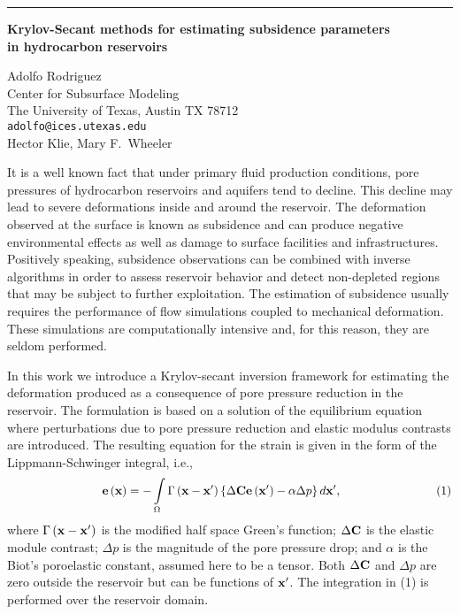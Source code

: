 \documentclass[twosided]{report}
\begin{document}
	\begin{center} \rule{6in}{1pt} \end{center}

\begin{center}
{\large			%
{\bf Krylov-Secant methods for estimating subsidence parameters \\
	in hydrocarbon reservoirs}}

	Adolfo Rodriguez \\
	Center for Subsurface Modeling \\
	The University of Texas,  Austin TX 78712 \\
	{\tt adolfo@ices.utexas.edu} \\
	Hector Klie, Mary F.~Wheeler
\end{center}
It is a well known fact that under primary fluid production
conditions, pore pressures of hydrocarbon reservoirs and
aquifers tend to decline. This decline may lead to severe
deformations inside and around the reservoir. The
deformation observed at the surface is known as subsidence
and can produce negative environmental effects as well as
damage to surface facilities and infrastructures. Positively
speaking, subsidence observations can be combined with
inverse algorithms in order to assess reservoir behavior and
detect non-depleted regions that may be subject to further
exploitation. The estimation of subsidence usually requires
the performance of flow simulations coupled to mechanical
deformation. These simulations are computationally intensive
and, for this reason, they are seldom performed.

In this
work we introduce a Krylov-secant inversion framework for
estimating the deformation produced as a consequence of pore
pressure reduction in the reservoir. The formulation is
based on a solution of the equilibrium equation where
perturbations due to pore pressure reduction and elastic
modulus contrasts are introduced. The resulting equation for
the strain is given in the form of the
Lippmann-Schwinger integral, i.e.,
$$
\qquad
\qquad
\qquad
\qquad
{\bf{e}}\left( {\bf{x}} \right)
= - \int\limits_\Omega
{\Gamma \left( {{\bf{x - x'}}} \right)}
\left\{ {\Delta {\bf{Ce}}\left( {{\bf{x'}}} \right)
- {\bf{\alpha }}\Delta p} \right\}d{\bf{x'}},
\qquad
\qquad
\qquad
\qquad
(1)
$$
where
$\Gamma \left( {{\bf{x - x'}}} \right)$
is the modified half space Green's function;
$\Delta\bf{C}$ is the elastic module contrast; $\Delta p$ is
the magnitude of the pore pressure drop; and $\alpha$ is the
Biot's poroelastic constant, assumed here to be a tensor.
Both $\Delta\bf{C}$ and $\Delta p$ are zero outside the
reservoir but can be functions of $\bf{x'}$. The integration
in (1) is performed over the reservoir domain.
\end{document}
